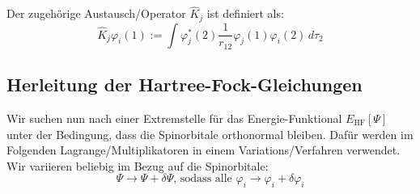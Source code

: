 Der zugehörige Austausch\-/Operator $\hat{K}_j$ ist definiert als:
\begin{equation}\label{exchange-operator}
  \hat{K}_j \varphi_i(1) :=
  \int \varphi_j^*(2) \frac{1}{r_{12}} \varphi_j(1) \varphi_i(2) \,d\tau_2
\end{equation}

\cite[S. 206]{lewars_2016} \cite[S. 23]{tc2_3}

\subsection{Herleitung der Hartree-Fock-Gleichungen}
Wir suchen nun nach einer Extremstelle für das Energie-Funktional $E_\textrm{HF}[\Psi]$ unter der Bedingung, 
dass die Spinorbitale orthonormal bleiben. 
Dafür werden im Folgenden Lagrange\-/Multiplikatoren in einem Variations\-/Verfahren verwendet.
Wir variieren beliebig im Bezug auf die Spinorbitale: 
\begin{equation}
\Psi \rightarrow \Psi + \delta \Psi
\text{, sodass alle } \varphi_i \rightarrow \varphi_i + \delta \varphi_i
\end{equation}

